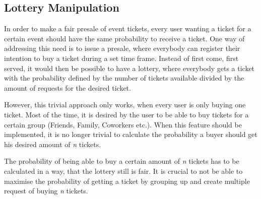 \subsection{Lottery Manipulation}\label{subsection:lottery-manipulation}
In order to make a fair presale of event tickets, every user wanting a ticket for a certain event should have the same probability to receive a ticket. One way of addressing this need is to issue a presale, where everybody can register their intention to buy a ticket during a set time frame. Instead of first come, first served, it would then be possible to have a lottery, where everybody gets a ticket with the probability defined by the number of tickets available divided by the amount of requests for the desired ticket.

However, this trivial approach only works, when every user is only buying one ticket. Most of the time, it is desired by the user to be able to buy tickets for a certain group (Friends, Family, Coworkers etc.). When this feature should be implemented, it is no longer trivial to calculate the probability a buyer should get his desired amount of \textit{n} tickets. 

The probability of being able to buy a certain amount of \textit{n} tickets has to be calculated in a way, that the lottery still is fair. It is crucial to not be able to maximise the probability of getting a ticket by grouping up and create multiple request of buying \textit{n} tickets.
